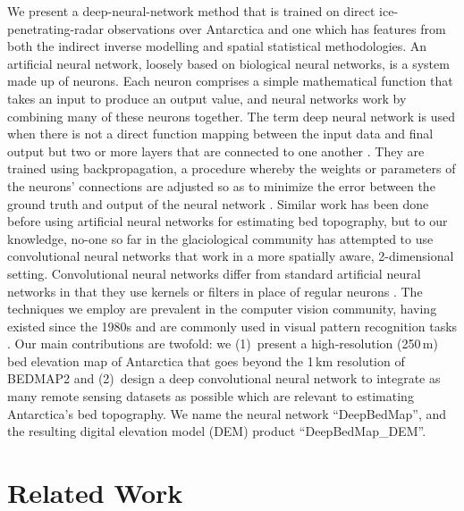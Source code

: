 We present a deep-neural-network method that is trained on direct ice-penetrating-radar observations over Antarctica and one which has features from both the indirect inverse modelling and spatial statistical methodologies.
An artificial neural network, loosely based on biological neural networks, is a system made up of neurons.
Each neuron comprises a simple mathematical function that takes an input to produce an output value, and neural networks work by combining many of these neurons together.
The term deep neural network is used when there is not a direct function mapping between the input data and final output but two or more layers that are connected to one another \citep[see][for a review]{LeCunDeeplearning2015}.
They are trained using backpropagation, a procedure whereby the weights or parameters of the neurons' connections are adjusted so as to minimize the error between the ground truth and output of the neural network \citep{RumelhartLearningrepresentationsbackpropagating1986}.
Similar work has been done before using artificial neural networks for estimating bed topography\citep[e.g.][]{ClarkeNeuralNetworksApplied2009,MonnierInferencebedtopography2018}, but to our knowledge, no-one so far in the glaciological community has attempted to use convolutional neural networks that work in a more spatially aware, 2-dimensional setting.
Convolutional neural networks differ from standard artificial neural networks in that they use kernels or filters in place of regular neurons \citep[again, see][for a review]{LeCunDeeplearning2015}.
The techniques we employ are prevalent in the computer vision community, having existed since the 1980s \citep{FukushimaNeocognitronnewalgorithm1982,LeCunBackpropagationAppliedHandwritten1989} and are commonly used in visual pattern recognition tasks \citep[e.g.][]{LecunGradientbasedlearningapplied1998,KrizhevskyImageNetClassificationDeep2012}.
Our main contributions are twofold:
we (1)~present a high-resolution (250\,\unit{m}) bed elevation map of Antarctica that goes beyond the 1\,\unit{km} resolution of BEDMAP2 \citep{FretwellBedmap2improvedice2013} and
(2)~design a deep convolutional neural network to integrate as many remote sensing datasets as possible which are relevant to estimating Antarctica's bed topography.
We name the neural network ``DeepBedMap'', and the resulting digital elevation model (DEM) product ``DeepBedMap\_DEM''.


\section{Related Work}

